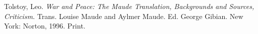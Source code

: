 \documentclass[12pt]{report}
\begin{document}

\pagebreak

\begin{thebibliography}{9}
  Tolstoy, Leo. \emph{War and Peace: The Maude Translation, Backgrounds and Sources, Criticism.}
  Trans. Louise Maude and Aylmer Maude. Ed. George Gibian. New York: Norton, 1996. Print.
\end{thebibliography}
\end{document}
